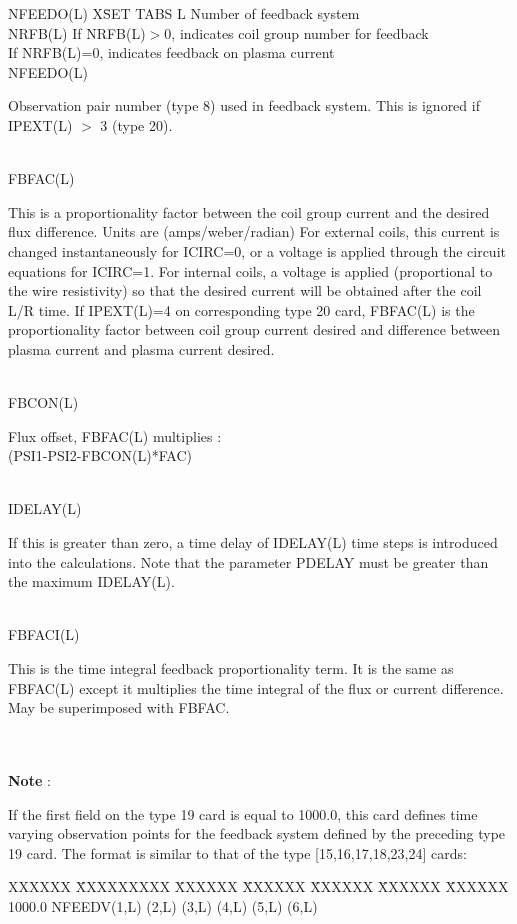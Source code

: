\begin{tabbing}
NFEEDO(L) X\= SET TABS \kill
L \> Number of feedback system\\
NRFB(L) \> If NRFB(L)$>$0, indicates coil group number for feedback\\
        \> If NRFB(L)=0, indicates feedback on plasma current\\
NFEEDO(L) \> \parbox[t]{\width}{Observation pair number (type 8) used in feedback system.  
This is ignored if IPEXT(L) $>$ 3 (type 20).}\\
FBFAC(L) \> \parbox[t]{\width}{This is a proportionality factor between the coil group current
and the desired flux difference.  Units are (amps/weber/radian)  For external coils, this current
is changed instantaneously for ICIRC=0, or a voltage is applied through
the circuit equations for ICIRC=1.
For internal coils, a voltage is applied (proportional to the wire
resistivity) so that the desired current will be obtained after the coil L/R time. If IPEXT(L)=4 on
corresponding type 20 card, FBFAC(L) is the proportionality factor between coil group current
desired and difference between plasma current and plasma current desired.}\\
FBCON(L) \> \parbox[t]{\width}{Flux offset, FBFAC(L) multiplies :\\
(PSI1-PSI2-FBCON(L)*FAC)}\\
IDELAY(L) \> \parbox[t]{\width}{If this is greater than zero, a time delay of IDELAY(L) time
steps is introduced into the calculations.  Note that the parameter PDELAY must be greater than
the maximum IDELAY(L).}\\
FBFACI(L) \> \parbox[t]{\width}{This is the time integral feedback proportionality term.  It is
the same as FBFAC(L) except it multiplies the time integral of the flux or current difference. 
May be superimposed with FBFAC.}\\
 \\
{\bf Note} :\> \parbox[t]{\width}{If the first field on the type 19 card is equal to 1000.0, this
card defines time varying observation points for the feedback system defined by the preceding
type 19 card. The format is similar to that of the type [15,16,17,18,23,24] cards:}
\end{tabbing}
\begin{tabbing}
XXXXXX \= XXXXXXXXX \= XXXXXX \= XXXXXX \= XXXXXX \= XXXXXX
\=XXXXXX       \\
\footnotesize  1000.0  \>\footnotesize NFEEDV(1,L)  \>\footnotesize (2,L) \>\footnotesize (3,L)
\>\footnotesize (4,L)  \>\footnotesize (5,L) \>\footnotesize(6,L)
\end{tabbing}
